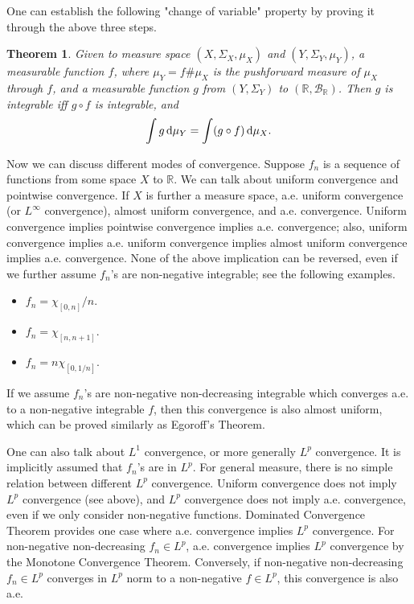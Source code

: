 \documentclass[openany]{book}
\newtheorem{theorem}{Theorem}[chapter]
\theoremstyle{definition}
\theoremstyle{remark}
\begin{document}
One can establish the following "change of variable" property by proving it through the above three steps.
\begin{theorem}
    Given to measure space $(X,\Sigma_X,\mu_X)$ and $(Y,\Sigma_Y,\mu_Y)$, a measurable function $f$, where $\mu_Y=f\#\mu_X$ is the pushforward measure of $\mu_X$ through $f$, and a measurable function $g$ from $(Y,\Sigma_Y)$ to $(\mathbb{R},\mathcal{B}_{\mathbb{R}})$. Then $g$ is integrable iff $g\circ f$ is integrable, and
    \begin{equation*}
        \int g \dif\mu_Y=\int(g\circ f)\dif\mu_X.
    \end{equation*}
\end{theorem}

Now we can discuss different modes of convergence. Suppose $f_n$ is a sequence of functions from some space $X$ to $\mathbb{R}$. We can talk about uniform convergence and pointwise convergence. If $X$ is further a measure space, a.e. uniform convergence (or $L^{\infty}$ convergence), almost uniform convergence, and a.e. convergence. Uniform convergence implies pointwise convergence implies a.e. convergence; also, uniform convergence implies a.e. uniform convergence implies almost uniform convergence implies a.e. convergence. None of the above implication can be reversed, even if we further assume $f_n$'s are non-negative integrable; see the following examples.
\begin{itemize}
    \item $f_n=\chi_{[0,n]}/n$.
    \item $f_n=\chi_{[n,n+1]}$.
    \item $f_n=n\chi_{[0,1/n]}$.
\end{itemize}
If we assume $f_n$'s are non-negative non-decreasing integrable which converges a.e. to a non-negative integrable $f$, then this convergence is also almost uniform, which can be proved similarly as Egoroff's Theorem.

One can also talk about $L^1$ convergence, or more generally $L^p$ convergence. It is implicitly assumed that $f_n$'s are in $L^p$. For general measure, there is no simple relation between different $L^p$ convergence. Uniform convergence does not imply $L^p$ convergence (see above), and $L^p$ convergence does not imply a.e. convergence, even if we only consider non-negative functions. Dominated Convergence Theorem provides one case where a.e. convergence implies $L^p$ convergence. For non-negative non-decreasing $f_n\in L^p$, a.e. convergence implies $L^p$ convergence by the Monotone Convergence Theorem. Conversely, if non-negative non-decreasing $f_n\in L^p$ converges in $L^p$ norm to a non-negative $f\in L^p$, this convergence is also a.e.
\end{document}
